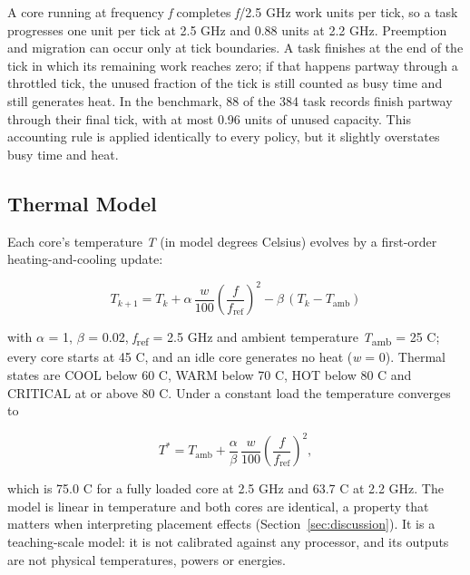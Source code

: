 \documentclass[conference]{IEEEtran}
\begin{document}
A core running at frequency \emph{f} completes \emph{f}/2.5 GHz work units per tick, so a task progresses one unit per tick at 2.5 GHz and 0.88 units at 2.2 GHz. Preemption and migration can occur only at tick boundaries. A task finishes at the end of the tick in which its remaining work reaches zero; if that happens partway through a throttled tick, the unused fraction of the tick is still counted as busy time and still generates heat. In the benchmark, 88 of the 384 task records finish partway through their final tick, with at most 0.96 units of unused capacity. This accounting rule is applied identically to every policy, but it slightly overstates busy time and heat.

\subsection{Thermal Model}\label{sec:model-thermal}
Each core's temperature \emph{T} (in model degrees Celsius) evolves by a first-order heating-and-cooling update:

\begin{equation}
T_{k+1} = T_k + \alpha\,\frac{w}{100}\left(\frac{f}{f_{\mathrm{ref}}}\right)^{2} - \beta\,(T_k - T_{\mathrm{amb}})
\label{eq:thermal}
\end{equation}

with $\alpha$ = 1, $\beta$ = 0.02, \emph{f}\textsubscript{ref} = 2.5 GHz and ambient temperature \emph{T}\textsubscript{amb} = 25 \textdegree{}C; every core starts at 45 \textdegree{}C, and an idle core generates no heat (\emph{w} = 0). Thermal states are COOL below 60 \textdegree{}C, WARM below 70 \textdegree{}C, HOT below 80 \textdegree{}C and CRITICAL at or above 80 \textdegree{}C. Under a constant load the temperature converges to

\begin{equation}
T^{*} = T_{\mathrm{amb}} + \frac{\alpha}{\beta}\,\frac{w}{100}\left(\frac{f}{f_{\mathrm{ref}}}\right)^{2},
\label{eq:steady}
\end{equation}

which is 75.0 \textdegree{}C for a fully loaded core at 2.5 GHz and 63.7 \textdegree{}C at 2.2 GHz. The model is linear in temperature and both cores are identical, a property that matters when interpreting placement effects (Section~\ref{sec:discussion}). It is a teaching-scale model: it is not calibrated against any processor, and its outputs are not physical temperatures, powers or energies.
\end{document}
